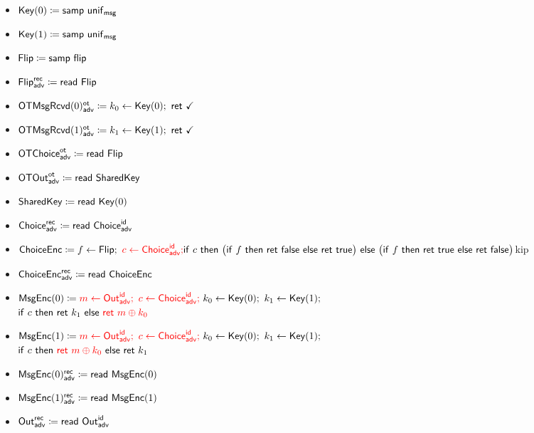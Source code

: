\begin{itemize}
\item $\Key(0) \coloneqq \samp{\unif_\msg}$
\item $\Key(1) \coloneqq \samp{\unif_\msg}$
\item $\Flip \coloneqq \samp{\flip}$
\item {\color{blue} $\LeakFlip^\rec_\adv \coloneqq \read{\Flip}$}
\item {\color{blue} $\LeakOTMsgRcvd(0)^\ot_\adv \coloneqq k_0 \leftarrow \Key(0); \ \ret{\checkmark}$}
\item {\color{blue} $\LeakOTMsgRcvd(1)^\ot_\adv \coloneqq k_1 \leftarrow \Key(1); \ \ret{\checkmark}$}
\item {\color{blue} $\LeakOTChoice^\ot_\adv \coloneqq \read{\Flip}$}
\item {\color{blue} $\LeakOTOut^\ot_\adv \coloneqq \read{\SharedKey}$}
\item $\SharedKey \coloneqq \read{\Key(0)}$
\item {\color{red} $\LeakChoice^\rec_\adv \coloneqq \read{\LeakChoice^\id_\adv}$}
\item $\ChoiceEnc \coloneqq f \leftarrow \Flip; \ {\color{red} c \leftarrow \LeakChoice^\id_\adv;} \\ \ifte{c}{\big(\ifte{f}{\ret{\false}}{\ret{\true}}\big)}{\big(\ifte{f}{\ret{\true}}{\ret{\false}}\big)}$kip
\item {\color{blue} $\LeakChoiceEnc^\rec_\adv \coloneqq \read{\ChoiceEnc}$}
\item $\MsgEnc(0) \coloneqq {\color{red} m \leftarrow \LeakOut^\id_\adv; \ c \leftarrow \LeakChoice^\id_\adv; \ } k_0 \leftarrow \Key(0); \ k_1 \leftarrow \Key(1);$ \\ $\ifte{c}{\ret{k_1}}{{\color{red} \ret{m \oplus k_0}}}$
\item $\MsgEnc(1) \coloneqq {\color{red} m \leftarrow \LeakOut^\id_\adv; \ c \leftarrow \LeakChoice^\id_\adv; \ } k_0 \leftarrow \Key(0); \ k_1 \leftarrow \Key(1);$ \\ $\ifte{c}{{\color{red} \ret{m \oplus k_0}}}{\ret{k_1}}$
\item {\color{blue} $\LeakMsgEnc(0)^\rec_\adv \coloneqq \read{\MsgEnc(0)}$}
\item {\color{blue} $\LeakMsgEnc(1)^\rec_\adv \coloneqq \read{\MsgEnc(1)}$}
\item {\color{red} $\LeakOut^\rec_\adv \coloneqq \read{\LeakOut^\id_\adv}$}
\end{itemize}
